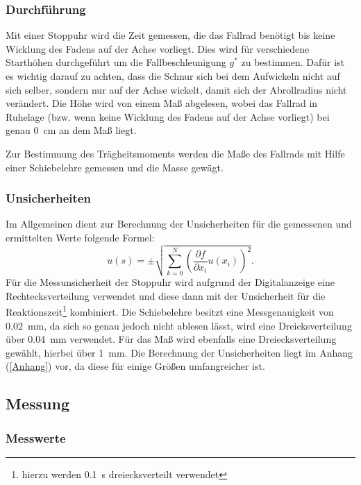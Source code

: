 		\subsubsection{Durchführung}
			
			Mit einer Stoppuhr wird die Zeit gemessen, die das Fallrad benötigt bis keine Wicklung des Fadens auf der Achse vorliegt. Dies wird für verschiedene Starthöhen durchgeführt um die Fallbeschleunigung $g^{*}$ zu bestimmen. Dafür ist es wichtig darauf zu achten, dass die Schnur sich bei dem Aufwickeln nicht auf sich selber, sondern nur auf der Achse wickelt, damit sich der Abrollradius nicht verändert.
			Die Höhe wird von einem Maß abgelesen, wobei das Fallrad in Ruhelage (bzw. wenn keine Wicklung des Fadens auf der Achse vorliegt) bei genau \SI{0}{\cm} an dem Maß liegt. 
			
			Zur Bestimmung des Trägheitsmoments werden die Maße des Fallrads mit Hilfe einer Schiebelehre gemessen und die Masse gewägt.			
			
		\subsubsection{Unsicherheiten}
			
			Im Allgemeinen dient zur Berechnung der Unsicherheiten für die gemessenen und ermittelten Werte folgende Formel: 
			\begin{equation*}
				u(s) = \pm \sqrt{\sum_{k=0}^{N}\left( \frac{\partial f}{\partial x_i}u(x_i)\right) ^2}. \label{eq:kombUnsicherheit}
			\end{equation*}
			Für die Messunsicherheit der Stoppuhr wird aufgrund der Digitalanzeige eine Rechtecksverteilung verwendet und diese dann mit der Unsicherheit für die Reaktionszeit\footnote{hierzu werden \SI{0.1}{\s} dreiecksverteilt verwendet} kombiniert. Die Schiebelehre besitzt eine Messgenauigkeit von \SI{0,02}{\mm}, da sich so genau jedoch nicht ablesen lässt, wird eine Dreicksverteilung über \SI{0,04}{\mm} verwendet. Für das Maß wird ebenfalls eine Dreiecksverteilung gewählt, hierbei über \SI{1}{\mm}.
			Die Berechnung der Unsicherheiten liegt im Anhang (\ref{Anhang})  vor, da diese für einige Größen umfangreicher ist.
			
	\subsection{Messung}
	
		\subsubsection{Messwerte}
			
